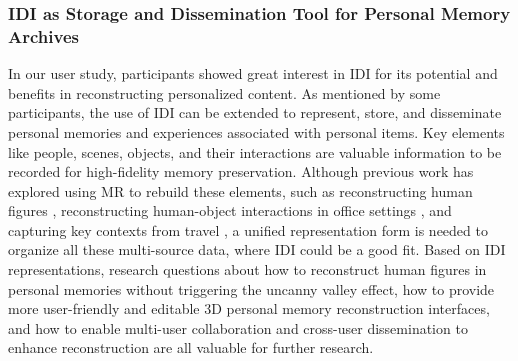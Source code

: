 



\subsubsection{IDI as Storage and Dissemination Tool for Personal Memory Archives}
In our user study, participants showed great interest in IDI for its potential and benefits in reconstructing personalized content. As mentioned by some participants, the use of IDI can be extended to represent, store, and disseminate personal memories and experiences associated with personal items.
Key elements like people, scenes, objects, and their interactions are valuable information to be recorded for high-fidelity memory preservation. 
Although previous work has explored using MR to rebuild these elements, such as reconstructing human figures \cite{10.1145/3139131.3139156}, reconstructing human-object interactions in office settings \cite{10.1145/3491102.3501836}, and capturing key contexts from travel \cite{10.1145/3613904.3642320}, a unified representation form is needed to organize all these multi-source data, where IDI could be a good fit.
Based on IDI representations, research questions about how to reconstruct human figures in personal memories without triggering the uncanny valley effect, how to provide more user-friendly and editable 3D personal memory reconstruction interfaces, and how to enable multi-user collaboration and cross-user dissemination to enhance reconstruction are all valuable for further research.

